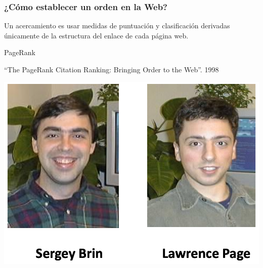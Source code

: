 \documentclass[
10pt, %
aspectratio=169, %
]{beamer}
\begin{document}
	\begin{frame}
		
		\frametitle{¿Cómo establecer un orden en la Web?}
		
		Un acercamiento es usar medidas de puntuación y clasificación derivadas únicamente de la estructura del enlace de cada página web. 
		
		\pause 
		\vspace{2\baselineskip}
		
		\noindent\begin{minipage}{.5\textwidth}
			
			\begin{centering}
				\begin{Large}
					
					PageRank\\[3mm]
					
				\end{Large}
			\end{centering}
			
			``The PageRank Citation Ranking: Bringing Order to the Web''. 1998
			
		\end{minipage}%
		\begin{minipage}{.55\textwidth}
			\centering
			\includegraphics[scale=0.35]{autores.png} 
		\end{minipage}
		
		
		
	\end{frame}
	
\end{document}
